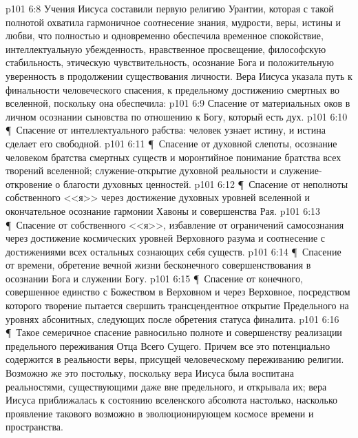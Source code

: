 \vs p101 6:8 Учения Иисуса составили первую религию Урантии, которая с такой полнотой охватила гармоничное соотнесение знания, мудрости, веры, истины и любви, что полностью и одновременно обеспечила временное спокойствие, интеллектуальную убежденность, нравственное просвещение, философскую стабильность, этическую чувствительность, осознание Бога и положительную уверенность в продолжении существования личности. Вера Иисуса указала путь к финальности человеческого спасения, к предельному достижению смертных во вселенной, поскольку она обеспечила:
\vs p101 6:9 \bibnobreakspace Спасение от материальных оков в личном осознании сыновства по отношению к Богу, который есть дух.
\vs p101 6:10 \P\ \bibnobreakspace Спасение от интеллектуального рабства: человек узнает истину, и истина сделает его свободной.
\vs p101 6:11 \P\ \bibnobreakspace Спасение от духовной слепоты, осознание человеком братства смертных существ и моронтийное понимание братства всех творений вселенной; служение\hyp{}открытие духовной реальности и служение\hyp{}откровение о благости духовных ценностей.
\vs p101 6:12 \P\ \bibnobreakspace Спасение от неполноты собственного <<я>> через достижение духовных уровней вселенной и окончательное осознание гармонии Хавоны и совершенства Рая.
\vs p101 6:13 \P\ \bibnobreakspace Спасение от собственного <<я>>, избавление от ограничений самосознания через достижение космических уровней Верховного разума и соотнесение с достижениями всех остальных сознающих себя существ.
\vs p101 6:14 \P\ \bibnobreakspace Спасение от времени, обретение вечной жизни бесконечного совершенствования в осознании Бога и служении Богу.
\vs p101 6:15 \P\ \bibnobreakspace Спасение от конечного, совершенное единство с Божеством в Верховном и через Верховное, посредством которого творение пытается свершить трансцендентное открытие Предельного на уровнях абсонитных, следующих после обретения статуса финалита.
\vs p101 6:16 \P\ Такое семеричное спасение равносильно полноте и совершенству реализации предельного переживания Отца Всего Сущего. Причем все это потенциально содержится в реальности веры, присущей человеческому переживанию религии. Возможно же это постольку, поскольку вера Иисуса была воспитана реальностями, существующими даже вне предельного, и открывала их; вера Иисуса приближалась к состоянию вселенского абсолюта настолько, насколько проявление такового возможно в эволюционирующем космосе времени и пространства.
